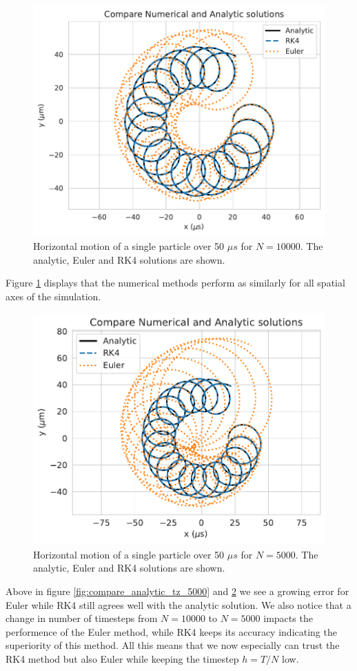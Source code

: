 \documentclass[english,notitlepage,reprint,nofootinbib]{revtex4-1}  %
\begin{document}
\begin{figure}[H]
    \centering
    \includegraphics[width=.5\textwidth]{../figures/compare_analytic_axis_0_1_N10000.pdf}
    \caption{Horizontal motion of a single particle over 50 $\mu s$ for $N=10000$. The analytic, Euler and RK4 solutions are shown.}
    \label{fig:compare_analytic_axis_0_1_N10000}
\end{figure}
Figure \ref{fig:compare_analytic_axis_0_1_N10000} displays that the numerical methods perform as similarly for all spatial axes of the simulation.
\begin{figure}[H]
    \centering
    \includegraphics[width=.5\textwidth]{../figures/compare_analytic_axis_0_1_N5000.pdf}
    \caption{Horizontal motion of a single particle over 50 $\mu s$ for $N=5000$. The analytic, Euler and RK4 solutions are shown.}
    \label{fig:compare_analytic_axis_0_1_N5000}
\end{figure}
Above in figure \ref{fig:compare_analytic_tz_5000} and \ref{fig:compare_analytic_axis_0_1_N5000} we see a growing error for Euler while RK4 still agrees well with the analytic solution.
We also notice that a change in number of timesteps from $N=10000$ to $N=5000$ impacts the performence of the Euler method, while RK4 keeps its accuracy indicating the superiority of this method.
All this means that we now especially can trust the RK4 method but also Euler while keeping the timestep $h=T/N$ low.
\end{document}
